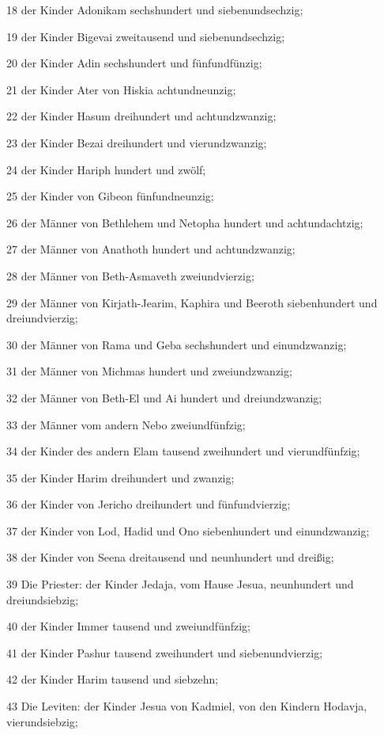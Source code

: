 \par 18 der Kinder Adonikam sechshundert und siebenundsechzig;
\par 19 der Kinder Bigevai zweitausend und siebenundsechzig;
\par 20 der Kinder Adin sechshundert und fünfundfünzig;
\par 21 der Kinder Ater von Hiskia achtundneunzig;
\par 22 der Kinder Hasum dreihundert und achtundzwanzig;
\par 23 der Kinder Bezai dreihundert und vierundzwanzig;
\par 24 der Kinder Hariph hundert und zwölf;
\par 25 der Kinder von Gibeon fünfundneunzig;
\par 26 der Männer von Bethlehem und Netopha hundert und achtundachtzig;
\par 27 der Männer von Anathoth hundert und achtundzwanzig;
\par 28 der Männer von Beth-Asmaveth zweiundvierzig;
\par 29 der Männer von Kirjath-Jearim, Kaphira und Beeroth siebenhundert und dreiundvierzig;
\par 30 der Männer von Rama und Geba sechshundert und einundzwanzig;
\par 31 der Männer von Michmas hundert und zweiundzwanzig;
\par 32 der Männer von Beth-El und Ai hundert und dreiundzwanzig;
\par 33 der Männer vom andern Nebo zweiundfünfzig;
\par 34 der Kinder des andern Elam tausend zweihundert und vierundfünfzig;
\par 35 der Kinder Harim dreihundert und zwanzig;
\par 36 der Kinder von Jericho dreihundert und fünfundvierzig;
\par 37 der Kinder von Lod, Hadid und Ono siebenhundert und einundzwanzig;
\par 38 der Kinder von Seena dreitausend und neunhundert und dreißig;
\par 39 Die Priester: der Kinder Jedaja, vom Hause Jesua, neunhundert und dreiundsiebzig;
\par 40 der Kinder Immer tausend und zweiundfünfzig;
\par 41 der Kinder Pashur tausend zweihundert und siebenundvierzig;
\par 42 der Kinder Harim tausend und siebzehn;
\par 43 Die Leviten: der Kinder Jesua von Kadmiel, von den Kindern Hodavja, vierundsiebzig;
